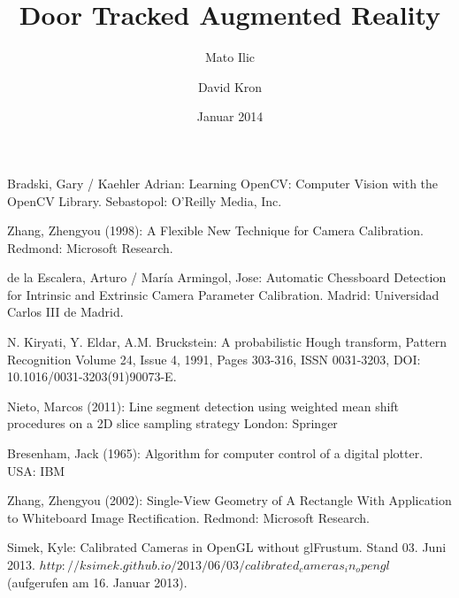 \documentclass[listof=totocnumbered,bibliography=totocnumbered,12pt,oneside]{scrreprt}
\numberwithin{equation}{subsection}
\begin{document}
\pagestyle{fancy}

\subject{Bachelor-Thesis}
\title{Door Tracked Augmented Reality}
\author{Mato Ilic \and David Kron}
\date{Januar 2014}
\publishers{Betreuer: Marcus Hudritsch\\Experte: Andreas Dürsteler}

\maketitle


\newpage

\tableofcontents
\newpage


\newpage


\newpage


\newpage

%


\newpage


\newpage


\newpage


\newpage


\newpage
\begin{thebibliography}{5}

Bradski, Gary / Kaehler Adrian:
Learning OpenCV: Computer Vision with the OpenCV Library.
Sebastopol: O'Reilly Media, Inc.

Zhang, Zhengyou (1998): A Flexible New Technique for Camera Calibration. 
Redmond: Microsoft Research.

de la Escalera, Arturo / María Armingol, Jose: Automatic Chessboard Detection for Intrinsic and Extrinsic Camera Parameter Calibration. 
Madrid: Universidad Carlos III de Madrid.

N. Kiryati, Y. Eldar, A.M. Bruckstein:
A probabilistic Hough transform, Pattern Recognition 
Volume 24, Issue 4, 1991, Pages 303-316, ISSN 0031-3203, DOI: 10.1016/0031-3203(91)90073-E. 

Nieto, Marcos (2011): Line segment detection using weighted mean shift procedures on a 2D slice sampling strategy
London: Springer

Bresenham, Jack (1965): Algorithm for computer control of a digital plotter. 
USA: IBM

Zhang, Zhengyou (2002): Single-View Geometry of A Rectangle With Application to Whiteboard Image Rectification.
Redmond: Microsoft Research.

Simek, Kyle: Calibrated Cameras in OpenGL without glFrustum. Stand 03. Juni 2013. $http://ksimek.github.io/2013/06/03/calibrated_cameras_in_opengl$  (aufgerufen am 16. Januar 2013).


\end{thebibliography}
\end{document}
